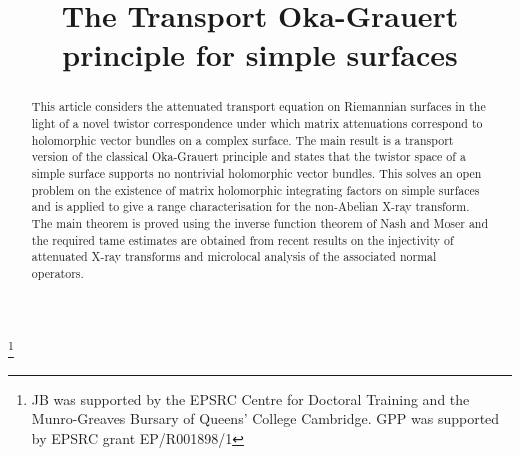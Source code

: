 \documentclass[JEP,XML,SOM,Unicode,published]{cedram}
\theoremstyle{plain}
\theoremstyle{definition}
\newcommand{\1}{{\bf 1}}
\begin{document}
\frontmatter

\title[The TOG-principle for simple surfaces]{The Transport Oka-Grauert principle for simple surfaces}

\author[\initial{J.} \lastname{Bohr}]{ }
\address{Mathematical Institute of the University of Bonn\\
Endenicher Allee 60, 53115 Bonn, Germany}

\author[\initial{G.} \middlename{P.} \lastname{Paternain}]{  }
\address{Department of Pure Mathematics and Mathematical Statistics,
University of Cambridge\\
Cambridge CB3 0WB, UK}

\thanks{JB was supported by the EPSRC Centre for Doctoral Training and the Munro-Greaves Bursary of Queens' College Cambridge.
GPP was supported by EPSRC grant EP/R001898/1}

\begin{abstract}
This article considers the attenuated transport equation on Riemannian surfaces in the light of a novel twistor correspondence under which matrix attenuations correspond to holomorphic vector bundles on a complex surface. The main result is a transport version of the classical Oka-Grauert principle and states that the twistor space of a simple surface supports no nontrivial holomorphic vector bundles. This solves an open problem on the existence of matrix holomorphic integrating factors on simple surfaces and is applied to give a range characterisation for the non-Abelian X-ray transform. The main theorem is proved using the inverse function theorem of Nash and Moser and the required tame estimates are obtained from recent results on the injectivity of attenuated X-ray transforms and microlocal analysis of the associated normal operators.
\end{abstract}




\end{document}
